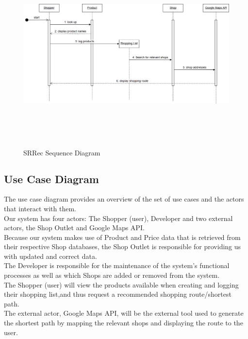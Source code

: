 \documentclass[12pt]{article}
\begin{document}
\begin{figure}[H]
  \includegraphics[width=\textwidth ,height=10cm]{SequenceDiagram.png}
  \centering
  \caption{SRRec Sequence Diagram}
  \label{fig:Sequence Diagram}
\end{figure}


\subsection{Use Case Diagram}
The use case diagram provides an overview of the set of use cases and the actors that interact with them.\\
Our system has four actors: The Shopper (user), Developer and two external actors, the Shop Outlet and Google Maps API.\\
Because our system makes use of Product and Price data that is retrieved from their respective Shop databases, the Shop Outlet is responsible for providing us with updated and correct data.\\
The Developer is responsible for the maintenance of the system’s functional processes as well as which Shops are added or removed from the system.\\
The Shopper (user) will view the products available when creating and logging their shopping list,and thus request a recommended shopping route/shortest path.\\
The external actor, Google Maps API, will be the external tool used to generate the shortest path by mapping the relevant shops and displaying the route to the user.\\
\end{document}
